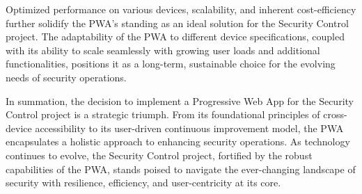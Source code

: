 \documentclass[journal]{IEEEtran}
\begin{document}
	Optimized performance on various devices, scalability, and inherent cost-efficiency further solidify the PWA's standing as an ideal solution for the Security Control project. The adaptability of the PWA to different device specifications, coupled with its ability to scale seamlessly with growing user loads and additional functionalities, positions it as a long-term, sustainable choice for the evolving needs of security operations.
	
	In summation, the decision to implement a Progressive Web App for the Security Control project is a strategic triumph. From its foundational principles of cross-device accessibility to its user-driven continuous improvement model, the PWA encapsulates a holistic approach to enhancing security operations. As technology continues to evolve, the Security Control project, fortified by the robust capabilities of the PWA, stands poised to navigate the ever-changing landscape of security with resilience, efficiency, and user-centricity at its core.
\end{document}
